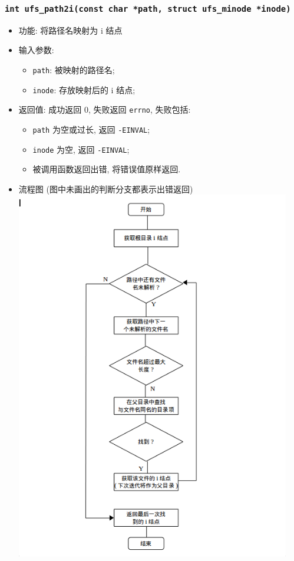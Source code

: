 \documentclass[nofonts]{ctexart}
\begin{document}
  \subsubsection[\texttt{ufs\_path2i}]{\texttt{int ufs\_path2i(const char *path, struct ufs\_minode *inode)}}
  \begin{itemize}
\item
  功能: 将路径名映射为 i 结点
\item
  输入参数:

  \begin{itemize}
  \item
    \texttt{path}: 被映射的路径名;
  \item
    \texttt{inode}: 存放映射后的 i 结点;
  \end{itemize}
\item
  返回值: 成功返回 0, 失败返回 \texttt{errno}, 失败包括:

  \begin{itemize}
  \item
    \texttt{path} 为空或过长, 返回 \texttt{-EINVAL};
  \item
    \texttt{inode} 为空, 返回 \texttt{-EINVAL};
  \item
    被调用函数返回出错, 将错误值原样返回.
  \end{itemize}
\item
  流程图 (图中未画出的判断分支都表示出错返回)\\
  \includegraphics[width=12cm]{./images/path2i.png}
  \end{itemize}
\end{document}
